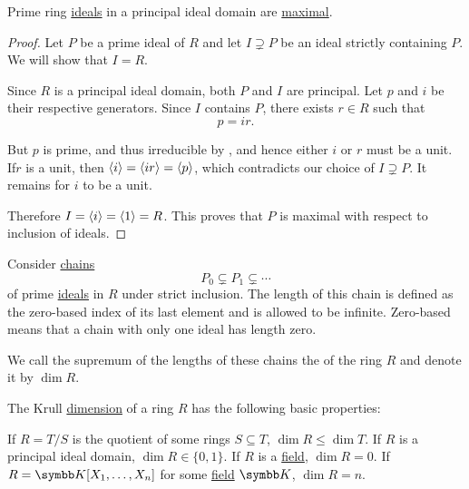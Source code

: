 \begin{proposition}\label{thm:prime_ideals_are_maximal_in_pid}
  Prime ring \hyperref[def:prime_ring_ideal]{ideals} in a principal ideal domain are \hyperref[def:maximal_ring_ideal]{maximal}.
\end{proposition}
\begin{proof}
  Let \( P \) be a prime ideal of \( R \) and let \( I \supsetneq P \) be an ideal strictly containing \( P \). We will show that \( I = R \).

  Since \( R \) is a principal ideal domain, both \( P \) and \( I \) are principal. Let \( p \) and \( i \) be their respective generators. Since \( I \) contains \( P \), there exists \( r \in R \) such that
  \begin{equation*}
    p = ir.
  \end{equation*}

  But \( p \) is prime, and thus irreducible by , and hence either \( i \) or \( r \) must be a unit. If\LEM \( r \) is a unit, then \( \left\langle i \right\rangle = \left\langle ir \right\rangle = \left\langle p \right\rangle \), which contradicts our choice of \( I \supsetneq P \). It remains for \( i \) to be a unit.

  Therefore \( I = \left\langle i \right\rangle = \left\langle 1 \right\rangle = R \). This proves that \( P \) is maximal with respect to inclusion of ideals.
\end{proof}

\begin{definition}\label{def:krull_dimension}\cite[67]{Коцев2016}
  Consider \hyperref[def:tower_diagram]{chains}
  \begin{equation*}
    P_0 \subsetneq P_1 \subsetneq \cdots
  \end{equation*}
  of prime \hyperref[def:prime_ring_ideal]{ideals} in \( R \) under strict inclusion. The length of this chain is defined as the zero-based index of its last element and is allowed to be infinite. Zero-based means that a chain with only one ideal has length zero.

  We call the supremum of the lengths of these chains the  of the ring \( R \) and denote it by \( \dim R \).
\end{definition}

\begin{proposition}\label{thm:krull_dimension_properties}
  The Krull \hyperref[def:krull_dimension]{dimension} of a ring \( R \) has the following basic properties:
  \begin{propenum}
     If \( R = T / S \) is the quotient of some rings \( S \subseteq T \), \( \dim R \leq \dim T \).
     If \( R \) is a principal ideal domain, \( \dim R \in \{ 0, 1 \} \).
     If \( R \) is a \hyperref[def:field]{field}, \( \dim R = 0 \).
    \cite[exercise 8.19]{Коцев2016} If \( R = \BK[X_1, \ldots, X_n] \) for some \hyperref[def:field]{field} \( \BK \), \( \dim R = n \).
  \end{propenum}
\end{proposition}

